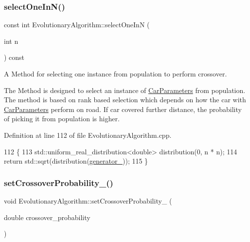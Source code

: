 \subsubsection{\texorpdfstring{select\+One\+In\+N()}{selectOneInN()}}
{\footnotesize\ttfamily const int Evolutionary\+Algorithm\+::select\+One\+InN (\begin{DoxyParamCaption}\item[{int}]{n }\end{DoxyParamCaption}) const\hspace{0.3cm}{\ttfamily [private]}}



A Method for selecting one instance from population to perform crossover. 

The Method is designed to select an instance of \hyperlink{classCarParameters}{Car\+Parameters} from population. The method is based on rank based selection which depends on how the car with \hyperlink{classCarParameters}{Car\+Parameters} perform on road. If car covered further distance, the probability of picking it from population is higher. 

Definition at line 112 of file Evolutionary\+Algorithm.\+cpp.


\begin{DoxyCode}
112                                                          \{
113     std::uniform\_real\_distribution<double> distribution(0, n * n);
114     \textcolor{keywordflow}{return} std::sqrt(distribution(\hyperlink{classEvolutionaryAlgorithm_adbd823d385ad95bf20496fd2fc25ccde}{generator\_}));
115 \}
\end{DoxyCode}
\mbox{\label{classEvolutionaryAlgorithm_ab5951bdd3eec16074aff63349726dee8}} 
\subsubsection{\texorpdfstring{set\+Crossover\+Probability\+\_\+()}{setCrossoverProbability\_()}}
{\footnotesize\ttfamily void Evolutionary\+Algorithm\+::set\+Crossover\+Probability\+\_\+ (\begin{DoxyParamCaption}\item[{double}]{crossover\+\_\+probability }\end{DoxyParamCaption})}



